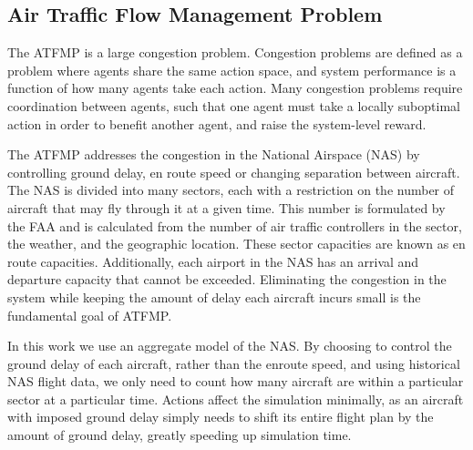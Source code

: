 \documentclass[letterpaper]{article}
\begin{document}
\subsection{Air Traffic Flow Management Problem}

The ATFMP is a large congestion problem. Congestion problems are defined as a problem where agents share the same action space, and system performance is a function of how many agents take each action. Many congestion problems require coordination between agents, such that one agent must take a locally suboptimal action in order to benefit another agent, and raise the system-level reward.

The ATFMP addresses the congestion in the National Airspace (NAS) by controlling ground delay, en route speed or changing separation between aircraft. The NAS is divided into many sectors, each with a restriction on the number of aircraft that may fly through it at a given time. This number is formulated by the FAA and is calculated from the number of air traffic controllers in the sector, the weather, and the geographic location. These sector capacities are known as en route capacities. Additionally, each airport in the NAS has an arrival and departure capacity that cannot be exceeded. Eliminating the congestion in the system while keeping the amount of delay each aircraft incurs small is the fundamental goal of ATFMP. 


In this work we use an aggregate model of the NAS. By choosing to control the ground delay of each aircraft, rather than the enroute speed, and using historical NAS flight data, we only need to count how many aircraft are within a particular sector at a particular time. Actions affect the simulation minimally, as an aircraft with imposed ground delay simply needs to shift its entire flight plan by the amount of ground delay, greatly speeding up simulation time.
\end{document}
